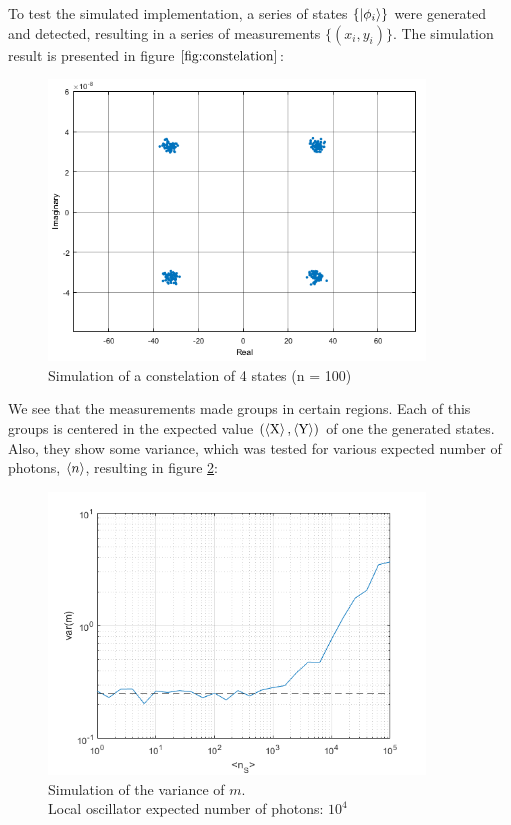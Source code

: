 To test the simulated implementation, a series of states $\{\ket{\phi_i}\}$ were generated and detected, resulting in a series of measurements $\{(x_i,y_i)\}$. The simulation result is presented in figure $\ref{fig:constelation}$:
%
\begin{figure}[H]
\centering
\includegraphics[width=10cm]{./sdf/quantum_noise/figures/constelation1.png}
\caption{Simulation of a constelation of 4 states (n = 100)}
\label{fig:constelation}
\end{figure}
%
We see that the measurements made groups in certain regions. Each of this groups is centered in the expected value $(\braket{\textrm{X}}, \braket{\textrm{Y}})$ of one the generated states. Also, they show some variance, which was tested for various expected number of photons, $\braket{n}$, resulting in figure \ref{fig:variance}:
%
\begin{figure}[H]
\captionsetup{justification=centering}
\centering
\includegraphics[width=10cm]{./sdf/quantum_noise/figures/plot_var_vs_n1.png}
\caption{Simulation of the variance of $m$.\\Local oscillator expected number of photons: $10^4$}
\label{fig:variance}
\end{figure}
